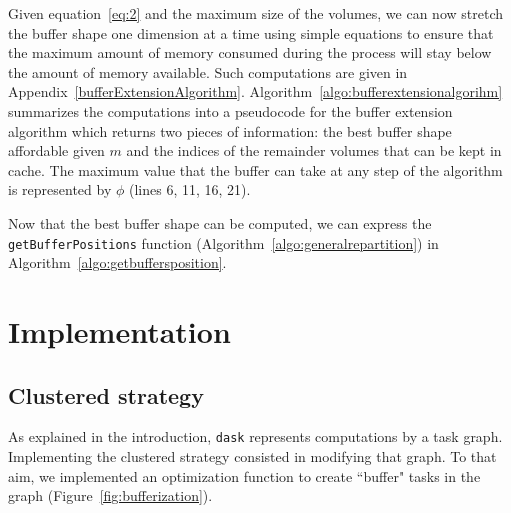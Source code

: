 \documentclass[conference]{IEEEtran}
\begin{document}
Given equation~\ref{eq:2} and the maximum size of the volumes, we can now
stretch the buffer shape one dimension at a time using simple equations to ensure
that the maximum amount of memory consumed during the process will stay below the
amount of memory available. Such computations are given in
Appendix~\ref{bufferExtensionAlgorithm}.
Algorithm~\ref{algo:bufferextensionalgorihm} summarizes the computations into a
pseudocode for the buffer extension algorithm which returns two pieces of
information: the best buffer shape affordable given $m$ and the indices of the
remainder volumes that can be kept in cache. The maximum value that the buffer
can take at any step of the algorithm is represented by $\phi$ (lines 6, 11,
16, 21).

Now that the best buffer shape can be computed, we can express the
\texttt{getBufferPositions} function (Algorithm~\ref{algo:generalrepartition}) in
Algorithm~\ref{algo:getbuffersposition}.

\section{Implementation}

\subsection{Clustered strategy}

As explained in the introduction, \texttt{dask} represents computations by a task graph.
Implementing the clustered strategy consisted in modifying that graph. To that
aim, we implemented an optimization function to create ``buffer" tasks in the
graph (Figure~\ref{fig:bufferization}).
\end{document}
